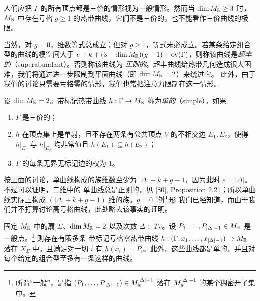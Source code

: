 \begin{remark}
人们应把 $\Gamma$ 的所有顶点都是三价的情形视为一般情形。然而当 $\dim M_{\mathbb{R}} \ge 3$ 时，$M_{\mathbb{R}}$ 中存在亏格
$g \ge 1$ 的热带曲线，它们不是三价的，也不能看作三价曲线的极限。

当然，对 $g = 0$，维数等式总成立；但对 $g \ge 1$，等式未必成立。若某条给定组合型的曲线的模空间大于
$e+k+(3-\dim M_{\mathbb{R}})(g-1)-\operatorname{ov}(\Gamma)$，则称该曲线是\emph{超丰的}（superabundant）。否则称该曲线为
\emph{正则的}。超丰曲线给热带几何造成很大困难，我们将通过进一步限制到平面曲线（即 $\dim M_{\mathbb{R}} = 2$）来绕过它。
此外，由于我们的讨论只需要亏格零的情形，我们也常把注意力限制在这一情形。
\end{remark}

\begin{definition}
设 $\dim M_{\mathbb{R}} = 2$。带标记热带曲线 $h : \Gamma \to M_{\mathbb{R}}$ 称为\emph{单的}（simple），如果
\begin{enumerate}[label=(\arabic*),leftmargin=*]
\item $\Gamma$ 是三价的；
\item $h$ 在顶点集上是单射，且不存在两条有公共顶点 $V$ 的不相交边 $E_1, E_2$，使得 $h|_{E_1}$ 与 $h|_{E_2}$
均非常值且 $h(E_1) \subseteq h(E_2)$；
\item $\Gamma$ 的每条无界无标记边的权为 $1$。
\end{enumerate}
\end{definition}

按上面的讨论，单曲线构成的族维数至少为 $|\Delta| + k + g - 1$，因为此时 $e = |\Delta|$。不过可以证明，二维中的
单曲线总是正则的，见 [80], Proposition 2.21；所以单曲线实际上构成 $(|\Delta|+k+g-1)$ 维的族。$g=0$ 的情形
我们已经知道，而由于我们并不打算讨论高亏格曲线，此处略去该事实的证明。

\begin{lemma}
固定 $M_{\mathbb{R}}$ 中的扇 $\Sigma$、$\dim M_{\mathbb{R}} = 2$ 以及次数 $\Delta \in T_\Sigma$。设
$P_1,\dots,P_{|\Delta|-1} \in M_{\mathbb{R}}$ 是一般点。\footnote{所谓“一般”，是指
$(P_1,\dots,P_{|\Delta|-1}) \in M_{\mathbb{R}}^{|\Delta|-1}$ 落在 $M_{\mathbb{R}}^{|\Delta|-1}$ 的某个稠密开子集中。} 则存在有限多条
带标记亏格零热带曲线 $h : (\Gamma,x_1,\dots,x_{|\Delta|-1}) \to M_{\mathbb{R}}$ 落在 $X_\Sigma$ 中，且满足对一切 $i$ 有
$h(x_i) = P_i$。此外，这些曲线都是单的，并且对每个给定的组合型至多有一条这样的曲线。
\end{lemma}

